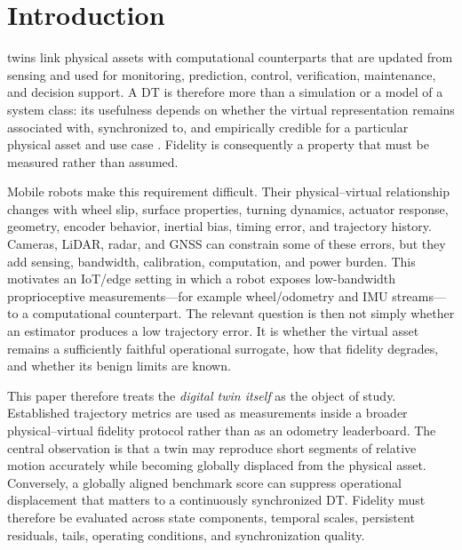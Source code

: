 \documentclass[journal]{IEEEtran}
\begin{document}
\section{Introduction}
 twins link physical assets with computational counterparts that are updated from sensing and used for monitoring, prediction, control, verification, maintenance, and decision support. A DT is therefore more than a simulation or a model of a system class: its usefulness depends on whether the virtual representation remains associated with, synchronized to, and empirically credible for a particular physical asset and use case \cite{dtc,jones2020,shao2023,nist8620}. Fidelity is consequently a property that must be measured rather than assumed.

Mobile robots make this requirement difficult. Their physical--virtual relationship changes with wheel slip, surface properties, turning dynamics, actuator response, geometry, encoder behavior, inertial bias, timing error, and trajectory history. Cameras, LiDAR, radar, and GNSS can constrain some of these errors, but they add sensing, bandwidth, calibration, computation, and power burden. This motivates an IoT/edge setting in which a robot exposes low-bandwidth proprioceptive measurements---for example wheel/odometry and IMU streams---to a computational counterpart. The relevant question is then not simply whether an estimator produces a low trajectory error. It is whether the virtual asset remains a sufficiently faithful operational surrogate, how that fidelity degrades, and whether its benign limits are known.

This paper therefore treats the \emph{digital twin itself} as the object of study. Established trajectory metrics are used as measurements inside a broader physical--virtual fidelity protocol rather than as an odometry leaderboard. The central observation is that a twin may reproduce short segments of relative motion accurately while becoming globally displaced from the physical asset. Conversely, a globally aligned benchmark score can suppress operational displacement that matters to a continuously synchronized DT. Fidelity must therefore be evaluated across state components, temporal scales, persistent residuals, tails, operating conditions, and synchronization quality.
\end{document}
